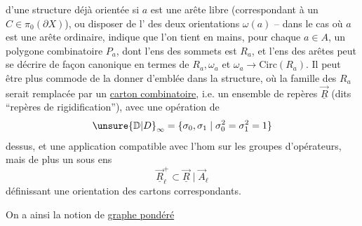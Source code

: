  d'une structure déjà orientée si $a$ est une arête libre (correspondant à un $C\in\pi_0(\partial X)$), ou  disposer de l' des deux orientations $\omega(a)$ -- dans le cas où $a$ est une arête ordinaire, indique que l'on tient en mains, pour chaque $a\in A$, un polygone combinatoire $P_a$, dont l'ens des sommets est $R_a$, et l'ens des arêtes peut se décrire  de façon canonique en termes de $R_a,\omega_a$ et $\omega_a\longrightarrow\mathrm{Circ}(R_a)$. Il peut être plus commode de la donner d'emblée dans la structure, où la famille des $R_a$ serait remplacée par un  \uline{carton combinatoire}, i.e. un ensemble de repères $\underline{\vec R}$ (dits ``repères de rigidification''), avec une opération de
\[
\unsure{\mathbb D|D}_\infty=\{\sigma_0,\sigma_1\mid\sigma_0^2=\sigma_1^2=1\}
\]
dessus, et une application
compatible avec l'hom
sur les groupes d'opérateurs, mais de plus un sous ens
\[
\underline{\vec R}^{+}_\ell\subset\underline{\vec R}\mid\vec A_\ell
\]
définissant une orientation des cartons correspondants.

On a ainsi la notion de \uline{graphe pondéré} 


